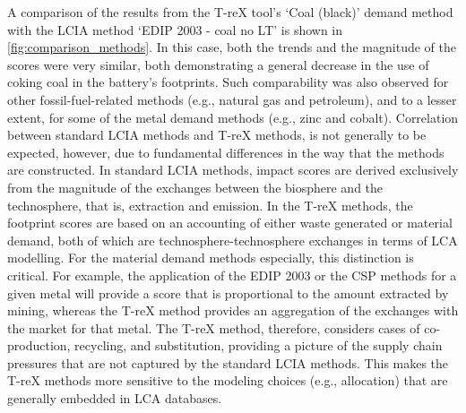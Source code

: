 A comparison of the results from the T-reX tool's `Coal (black)' demand method with the LCIA method `EDIP 2003 - coal no LT' is shown in \autoref{fig:comparison_methods}. In this case, both the trends and the magnitude of the scores were very similar, both demonstrating a general decrease in the use of coking coal in the battery's footprints. Such comparability was also observed for other fossil-fuel-related methods (e.g., natural gas and petroleum), and to a lesser extent, for some of the metal demand methods (e.g., zinc and cobalt). Correlation between standard LCIA methods and T-reX methods, is not generally to be expected, however, due to fundamental differences in the way that the methods are constructed. In standard LCIA methods, impact scores are derived exclusively from the magnitude of the exchanges between the biosphere and the technosphere, that is, extraction and emission. In the T-reX methods, the footprint scores are based on an accounting of either waste generated or material demand, both of which are technosphere-technosphere exchanges in terms of LCA modelling. For the material demand methods especially, this distinction is critical. For example, the application of the EDIP 2003 or the CSP methods for a given metal will provide a score that is proportional to the amount extracted by mining, whereas the T-reX method provides an aggregation of the exchanges with the market for that metal. The T-reX method, therefore, considers cases of co-production, recycling, and substitution, providing a picture of the supply chain pressures that are not captured by the standard LCIA methods. This makes the T-reX methods more sensitive to the modeling choices (e.g., allocation) that are generally embedded in LCA databases.

